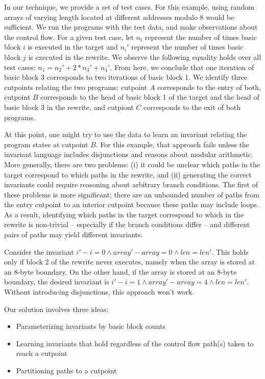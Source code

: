 In our technique, we provide a set of test cases. For this example,
using random arrays of varying length located at different addresses
modulo 8 would be sufficient. We run the programs with the test data,
and make observations about the control flow. For a given test case,
let $n_i$ represent the number of times basic block $i$ is executed in
the target and $n_i'$ represent the number of times basic block $j$
is executed in the rewrite. We observe the following
equality holds over all test cases: $n_1 = n_2' + 2*n_3' + n_4'$. From
here, we conclude that one iteration of basic block 3 corresponds
to two iterations of basic block 1. We identify three cutpoints
relating the two programs; cutpoint $A$ corresponds to the entry of
both, cutpoint $B$ corresponds to the head of basic block 1 of the
target and the head of basic block 3 in the rewrite, and cutpiont $C$
corresponds to the exit of both programs.

At this point, one might try to use the data to learn an invariant
relating the program states at cutpoint $B$. For this example, that
approach fails unless the invariant language includes disjunctions
and reasons about modular arithmetic. More generally, there are two
problems: (i) it could be unclear which paths in the target
correspond to which paths in the rewrite, and (ii) generating the
correct invariants could require reasoning about arbitrary branch
conditions. The first of these problems is more significant; there
are an unbounded number of paths from the entry cutpoint to an
interior cutpoint because these paths may include loops.  As a result,
identifying which paths in the target correspond to which in the
rewrite is non-trivial -- especially if the branch conditions differ
-- and different pairs of paths may yield different invariants.

Consider the invariant $i' - i = 0 \wedge array' - array
= 0 \wedge len = len'$. This holds only if block 2 of the rewrite
never executes, namely when the array is stored at an 8-byte boundary.
On the other hand, if the array is stored at an 8-byte boundary, the
desired invariant is $i' - i = 1 \wedge array' - array = 4 \wedge len
= len'$. Without introducing disjunctions, this approach won't work.

Our solution involves three ideas:

\begin{itemize}
\item Parameterizing invariants by basic block counts
\item Learning invariants that hold regardless of the control flow path(s) taken to reach a cutpoint
\item Partitioning paths to a cutpoint 
\end{itemize}

